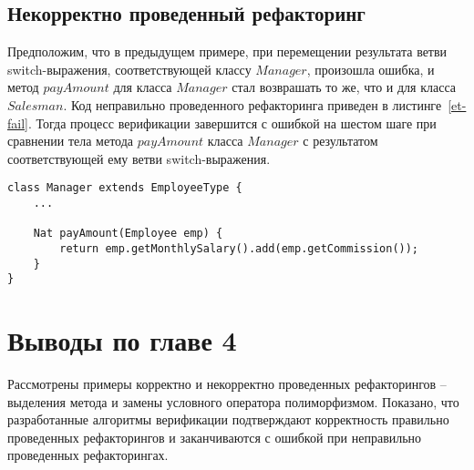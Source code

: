 \subsection{Некорректно проведенный рефакторинг}
Предположим, что в предыдущем примере, при перемещении результата ветви switch-выражения, соответствующей классу $Manager$, произошла ошибка,
и метод $payAmount$ для класса $Manager$ стал возврашать то же, что и для класса $Salesman$.
Код неправильно проведенного рефакторинга приведен в листинге~\ref{et-fail}.
Тогда процесс верификации завершится с ошибкой на шестом шаге при сравнении тела метода $payAmount$ класса $Manager$ с
результатом соответствующей ему ветви switch-выражения.
\begin{lstlisting}[float,label=et-fail,caption=Код после некорректно проведенного рефакторинга.]
class Manager extends EmployeeType {
    ...

    Nat payAmount(Employee emp) {
        return emp.getMonthlySalary().add(emp.getCommission());
    }
}
\end{lstlisting}
\section*{Выводы по главе 4}
Рассмотрены примеры корректно и некорректно проведенных рефакторингов -- выделения метода и замены условного оператора полиморфизмом.
Показано, что разработанные алгоритмы верификации подтверждают корректность правильно проведенных рефакторингов и заканчиваются с ошибкой
при неправильно проведенных рефакторингах.